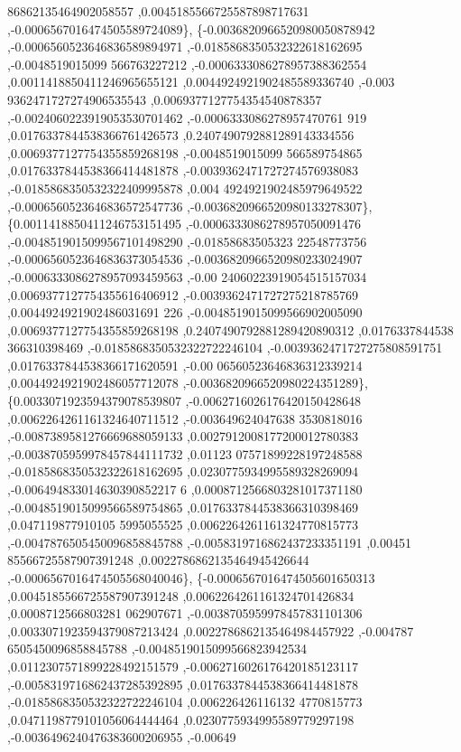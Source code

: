 \begin{DoxyCode}
      86862135464902058557 ,0.0045185566725587898717631 ,-0.0006567016474505589724089\},
\{-0.0036820966520980050878942 ,-0.0006560523646836589894971 ,-0.0185868350532322618162695 ,-0.0048519015099
      566763227212 ,-0.0006333086278957388362554 ,0.0011418850411246965655121 ,0.0044924921902485589336740 ,-0.003
      9362471727274906535543 ,0.0069377127754354540878357 ,-0.0024060223919053530701462 ,-0.0006333086278957470761
      919 ,0.0176337844538366761426573 ,0.2407490792881289143334556 ,0.0069377127754355859268198 ,-0.0048519015099
      566589754865 ,0.0176337844538366414481878 ,-0.0039362471727274576938083 ,-0.0185868350532322409995878 ,0.004
      4924921902485979649522 ,-0.0006560523646836572547736 ,-0.0036820966520980133278307\},
\{0.0011418850411246753151495 ,-0.0006333086278957050091476 ,-0.0048519015099567101498290 ,-0.01858683505323
      22548773756 ,-0.0006560523646836373054536 ,-0.0036820966520980233024907 ,-0.0006333086278957093459563 ,-0.00
      24060223919054515157034 ,0.0069377127754355616406912 ,-0.0039362471727275218785769 ,0.0044924921902486031691
      226 ,-0.0048519015099566902005090 ,0.0069377127754355859268198 ,0.2407490792881289420890312 ,0.0176337844538
      366310398469 ,-0.0185868350532322722246104 ,-0.0039362471727275808591751 ,0.0176337844538366171620591 ,-0.00
      06560523646836312339214 ,0.0044924921902486057712078 ,-0.0036820966520980224351289\},
\{0.0033071923594379078539807 ,-0.0062716026176420150428648 ,0.0062264261161324640711512 ,-0.003649624047638
      3530818016 ,-0.0087389581276669688059133 ,0.0027912008177200012780383 ,-0.0038705959978457844111732 ,0.01123
      07571899228197248588 ,-0.0185868350532322618162695 ,0.0230775934995589328269094 ,-0.006494833014630390852217
      6 ,0.0008712566803281017371180 ,-0.0048519015099566589754865 ,0.0176337844538366310398469 ,0.047119877910105
      5995055525 ,0.0062264261161324770815773 ,-0.0047876505450096858845788 ,-0.0058319716862437233351191 ,0.00451
      85566725587907391248 ,0.0022786862135464945426644 ,-0.0006567016474505568040046\},
\{-0.0006567016474505601650313 ,0.0045185566725587907391248 ,0.0062264261161324701426834 ,0.0008712566803281
      062907671 ,-0.0038705959978457831101306 ,0.0033071923594379087213424 ,0.0022786862135464984457922 ,-0.004787
      6505450096858845788 ,-0.0048519015099566823942534 ,0.0112307571899228492151579 ,-0.0062716026176420185123117
       ,-0.0058319716862437285392895 ,0.0176337844538366414481878 ,-0.0185868350532322722246104 ,0.006226426116132
      4770815773 ,0.0471198779101056064444464 ,0.0230775934995589779297198 ,-0.0036496240476383600206955 ,-0.00649

\end{DoxyCode}
